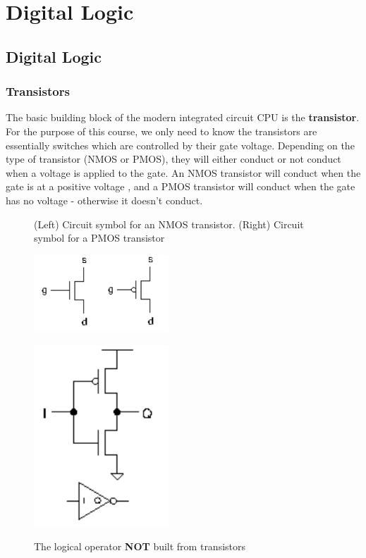 \documentclass{article}
\begin{document}
	
	\section{Digital Logic}
	\subsection{Digital Logic}
	\subsubsection{Transistors}
	The basic building block of the modern integrated circuit CPU is the \textbf{transistor}. For the purpose of this course, we only need to know the transistors are essentially switches which are controlled by their gate voltage. Depending on the type of transistor (NMOS or PMOS), they will either conduct or not conduct when a voltage is applied to the gate. An NMOS transistor will conduct when the gate is at a positive voltage , and a PMOS transistor will conduct when the gate has no voltage - otherwise it doesn't conduct.
	
	\begin{figure}[h]
	\begin{minipage}[t]{.45\textwidth}
		\caption{(Left) Circuit symbol for an NMOS transistor.  (Right) Circuit symbol for a PMOS transistor}
		\vspace{15pt}
		\centering
		\includegraphics[width=0.45\textwidth]{transistors}
		\label{fig:transistors}
	\end{minipage}
	\hfill
	\begin{minipage}[t]{.45\textwidth}
		\caption{The logical operator \textbf{NOT} built from transistors}
		\vspace{15pt}
		\centering
		\includegraphics[width=0.45\textwidth]{not_gate_transistors}
		\label{fig:not_transistors}
	\end{minipage}
	\end{figure}
	
\end{document}
